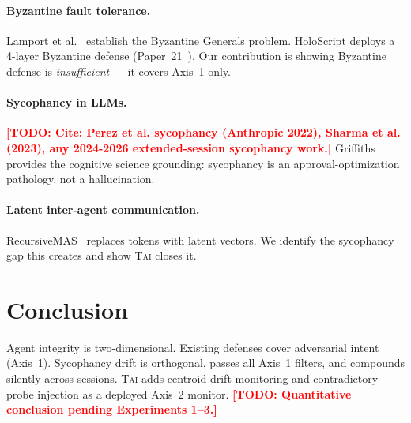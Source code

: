 \documentclass[letterpaper,twocolumn,10pt]{article}
\newcommand{\todo}[1]{\textcolor{red}{\textbf{[TODO: #1]}}}
\newcommand{\holoscript}{HoloScript}
\newcommand{\tai}{\textsc{Tai}}
\begin{document}
\paragraph{Byzantine fault tolerance.}
Lamport et al.~\cite{lamport1982} establish the Byzantine Generals problem.
\holoscript{} deploys a 4-layer Byzantine defense (Paper~21~\cite{p21ati2026}).
Our contribution is showing Byzantine defense is \emph{insufficient} — it
covers Axis~1 only.

\paragraph{Sycophancy in LLMs.}
\todo{Cite: Perez et al. sycophancy (Anthropic 2022), Sharma et al. (2023),
      any 2024-2026 extended-session sycophancy work.}
Griffiths~\cite{griffiths2026} provides the cognitive science grounding:
sycophancy is an approval-optimization pathology, not a hallucination.

\paragraph{Latent inter-agent communication.}
RecursiveMAS~\cite{recursivemas2026} replaces tokens with latent vectors.
We identify the sycophancy gap this creates and show \tai{} closes it.

\section{Conclusion}

Agent integrity is two-dimensional.
Existing defenses cover adversarial intent (Axis~1).
Sycophancy drift is orthogonal, passes all Axis~1 filters, and compounds
silently across sessions.
\tai{} adds centroid drift monitoring and contradictory probe injection as
a deployed Axis~2 monitor.
\todo{Quantitative conclusion pending Experiments 1--3.}



\end{document}
